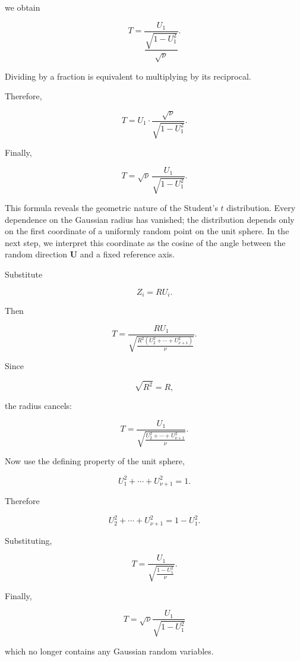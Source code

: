 \documentclass[11pt]{article}
\begin{document}
\begin{mdframed}[
		linewidth=0.8pt,
		roundcorner=6pt,
		backgroundcolor=gray!5,
		linecolor=gray!60,
		innertopmargin=10pt,
		innerbottommargin=10pt,
		innerleftmargin=10pt,
		innerrightmargin=10pt
		]
		we obtain
		
		\[
		T
		=
		\frac{U_1}
		{
			\dfrac{\sqrt{1-U_1^2}}{\sqrt\nu}
		}.
		\]
		
		Dividing by a fraction is equivalent to multiplying by its reciprocal.
		
		Therefore,
		
		\[
		T
		=
		U_1
		\cdot
		\frac{\sqrt\nu}
		{\sqrt{1-U_1^2}}.
		\]
		
		Finally,
		
		\[
		\boxed{
			T
			=
			\sqrt\nu\,
			\frac{U_1}
			{\sqrt{1-U_1^2}}.
		}
		\]
		
		This formula reveals the geometric nature of the Student's $t$
		distribution. Every dependence on the Gaussian radius has vanished; the
		distribution depends only on the first coordinate of a uniformly random
		point on the unit sphere. In the next step, we interpret this coordinate
		as the cosine of the angle between the random direction $\mathbf U$ and a
		fixed reference axis.
		
	\end{mdframed}
	
	Substitute
	
	\[
	Z_i=RU_i.
	\]
	
	Then
	
	\[
	T
	=
	\frac{RU_1}
	{
		\sqrt{
			\frac{
				R^2(U_2^2+\cdots+U_{\nu+1}^2)
			}{\nu}
		}
	}.
	\]
	
	Since
	
	\[
	\sqrt{R^2}=R,
	\]
	
	the radius cancels:
	
	\[
	T
	=
	\frac{U_1}
	{
		\sqrt{
			\frac{
				U_2^2+\cdots+U_{\nu+1}^2
			}{\nu}
		}
	}.
	\]
	
	Now use the defining property of the unit sphere,
	
	\[
	U_1^2+\cdots+U_{\nu+1}^2=1.
	\]
	
	Therefore
	
	\[
	U_2^2+\cdots+U_{\nu+1}^2
	=
	1-U_1^2.
	\]
	
	Substituting,
	
	\[
	T
	=
	\frac{U_1}
	{
		\sqrt{
			\frac{1-U_1^2}{\nu}
		}
	}.
	\]
	
	Finally,
	
	\[
	\boxed{
		T
		=
		\sqrt{\nu}
		\frac{U_1}{\sqrt{1-U_1^2}}
	}
	\]
	
	which no longer contains any Gaussian random variables.
	
	
\end{document}
